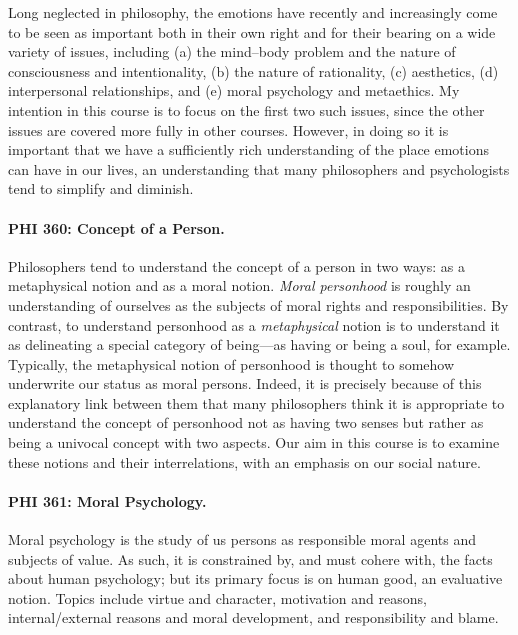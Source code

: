 \documentclass[%
  11pt,%
]{article}
\let\oldparagraph\paragraph
\renewcommand\paragraph[1]{\oldparagraph{\textcolor{myblue}{#1}}}
\begin{document}
Long neglected in philosophy, the emotions have recently and increasingly come to be seen as important both in their own right and for their bearing on a wide variety of issues, including (a) the mind--body problem and the nature of consciousness and intentionality, (b) the nature of rationality, (c) aesthetics, (d) interpersonal relationships, and (e) moral psychology and metaethics. My intention in this course is to focus on the first two such issues, since the other issues are covered more fully in other courses. However, in doing so it is important that we have a sufficiently rich understanding of the place emotions can have in our lives, an understanding that many philosophers and psychologists tend to simplify and diminish.

\paragraph{PHI 360: Concept of a Person.}

Philosophers tend to understand the concept of a person in two ways: as a metaphysical notion and as a moral notion. \emph{Moral personhood} is roughly an understanding of ourselves as the subjects of moral rights and responsibilities. By contrast, to understand personhood as a \emph{metaphysical} notion is to understand it as delineating a special category of being---as having or being a soul, for example. Typically, the metaphysical notion of personhood is thought to somehow underwrite our status as moral persons. Indeed, it is precisely because of this explanatory link between them that many philosophers think it is appropriate to understand the concept of personhood not as having two senses but rather as being a univocal concept with two aspects. Our aim in this course is to examine these notions and their interrelations, with an emphasis on our social nature.

\paragraph{PHI 361: Moral Psychology.}

Moral psychology is the study of us persons as responsible moral agents and subjects of value. As such, it is constrained by, and must cohere with, the facts about human psychology; but its primary focus is on human good, an evaluative notion. Topics include virtue and character, motivation and reasons, internal/external reasons and moral development, and responsibility and blame.
\end{document}
